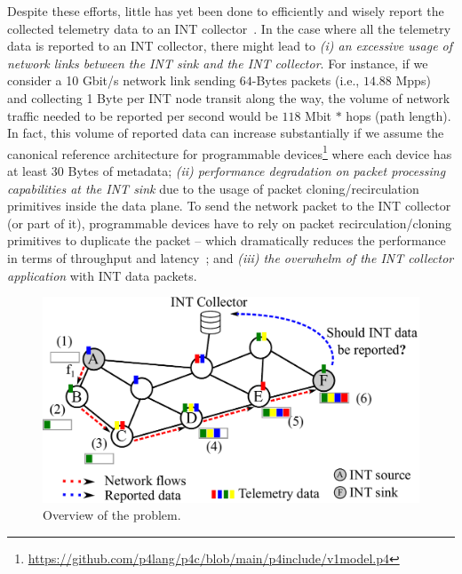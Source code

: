 Despite these efforts, little has yet been done to efficiently and wisely report the collected telemetry data to an INT collector~\cite{9525085}. In the case where all the telemetry data is reported to an INT collector, there might lead to \textit{(i) an excessive usage of network links between the INT sink and the INT collector}. For instance, if we consider a 10 Gbit/s network link sending $64$-Bytes packets (i.e.,  $14.88$ Mpps) and collecting 1 Byte per INT node transit along the way, the volume of network traffic needed to be reported per second would be $118$ Mbit $*$ hops (path length). In fact, this volume of reported data can increase substantially if we assume the canonical reference architecture for programmable devices\footnote{\url{https://github.com/p4lang/p4c/blob/main/p4include/v1model.p4}} where each device has at least 30 Bytes of metadata; \textit{(ii) performance degradation on packet processing capabilities at the INT sink} due to the usage of packet cloning/recirculation primitives inside the data plane. To send the network packet to the INT collector (or part of it), programmable devices have to rely on packet recirculation/cloning primitives to duplicate the packet -- which dramatically reduces the performance in terms of throughput and latency~\cite{aina2021}; and \textit{(iii) the overwhelm of the INT collector application} with INT data packets.

\begin{figure}[t]
\centering
        \includegraphics[scale=0.45]{aina-img/telemetry-canofre-aina.pdf}
        \caption{Overview of the problem.}
        \label{fig-problem-overview}
\end{figure}


